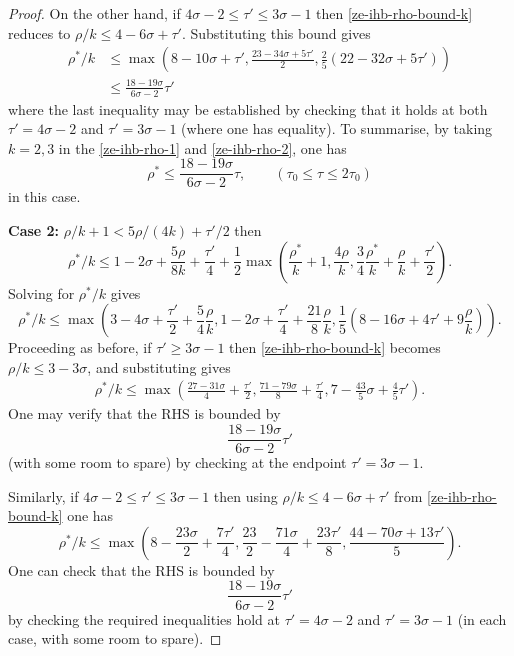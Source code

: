 \begin{proof}
On the other hand, if $4\sigma - 2 \le \tau' \le 3\sigma - 1$ then \eqref{ze-ihb-rho-bound-k} reduces to $\rho/k \le 4 - 6\sigma + \tau'$. Substituting this bound gives
\begin{equation}
\begin{split}
\rho^*/k &\le \max\left(8 -10\sigma + \tau',\frac{23 - 34\sigma + 5\tau'}{2}, \frac{2}{5}(22 - 32\sigma +  5\tau')\right)\\
&\le \frac{18 - 19\sigma}{6\sigma - 2}\tau'\label{ze-ihb-rho-2}
\end{split}
\end{equation}
where the last inequality may be established by checking that it holds at both $\tau' = 4\sigma - 2$ and $\tau' = 3\sigma - 1$ (where one has equality). To summarise, by taking $k = 2, 3$ in the \eqref{ze-ihb-rho-1} and \eqref{ze-ihb-rho-2}, one has
\[
\rho^* \le \frac{18 - 19\sigma}{6\sigma - 2}\tau,\qquad (\tau_0 \le \tau \le 2\tau_0)
\]
in this case.

\textbf{Case 2:} $\rho/k + 1 < 5\rho/(4k) + \tau'/2$ then
\[
\rho^*/k \leq 1-2\sigma + \frac{5\rho}{8k} + \frac{\tau'}{4} + \frac{1}{2}\max\left(\frac{\rho^*}{k}+1, \frac{4\rho}{k}, \frac{3}{4}\frac{\rho^*}{k} + \frac{\rho}{k}+\frac{\tau'}{2}\right).
\]
Solving for $\rho^*/k$ gives
\[
\rho^*/k \le \max\left(3 - 4\sigma + \frac{\tau'}{2} + \frac{5}{4}\frac{\rho}{k}, 1 - 2\sigma + \frac{\tau'}{4} + \frac{21}{8}\frac{\rho}{k}, \frac{1}{5}(8 - 16\sigma + 4\tau' + 9\frac{\rho}{k})\right).
\]
Proceeding as before, if $\tau' \ge 3\sigma - 1$ then \eqref{ze-ihb-rho-bound-k} becomes $\rho/k \le 3 - 3\sigma$, and substituting gives
\begin{align*}
\rho^*/k \le \max\left(\frac{27-31\sigma}{4} + \frac{\tau'}{2}, \frac{71-79\sigma}{8}+\frac{\tau'}{4}, 7-\frac{43}{5}\sigma + \frac{4}{5}\tau'\right).
\end{align*}
One may verify that the RHS is bounded by
\[
\frac{18 - 19\sigma}{6\sigma - 2}\tau'
\]
(with some room to spare) by checking at the endpoint $\tau' = 3\sigma - 1$.

Similarly, if $4\sigma - 2 \le \tau' \le 3\sigma - 1$ then using $\rho/k \le 4 - 6\sigma + \tau'$ from \eqref{ze-ihb-rho-bound-k} one has
\[
\rho^*/k \le \max\left(8 - \frac{23\sigma}{2} + \frac{7\tau'}{4}, \frac{23}{2} - \frac{71\sigma}{4} + \frac{23\tau'}{8}, \frac{44 - 70\sigma + 13\tau'}{5}\right).
\]
One can check that the RHS is bounded by
\[
\frac{18 - 19\sigma}{6\sigma - 2}\tau'
\]
by checking the required inequalities hold at $\tau' = 4\sigma - 2$ and $\tau' = 3\sigma - 1$ (in each case, with some room to spare).


\end{proof}
